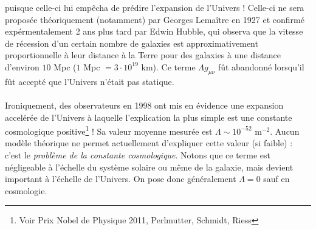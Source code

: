 puisque celle-ci lui empêcha de prédire l'expansion de l'Univers ! Celle-ci ne sera proposée théoriquement (notamment) par Georges Lemaître en 1927 et confirmé expérmentalement 2 ans plus tard par Edwin Hubble, qui observa que la vitesse de récession d'un certain nombre de galaxies est approximativement proportionnelle à leur distance à la Terre pour des galaxies à une distance d'environ $10$ Mpc ($1$ Mpc $ = 3 \cdot 10^{19}$ km). Ce terme $\Lambda g_{\mu\nu}$ fût abandonné lorsqu'il fût accepté que l'Univers n'était pas statique.\\
\\
Ironiquement, des observateurs en 1998 ont mis en évidence une expansion accelérée de l'Univers à laquelle l'explication la plus simple est une constante cosmologique positive\footnote{Voir Prix Nobel de Physique 2011, Perlmutter, Schmidt, Riess} ! Sa valeur moyenne mesurée est $\Lambda \sim 10^{-52}$ m$^{-2}$. Aucun modèle théorique ne permet actuellement d'expliquer cette valeur (si faible) : c'est le \emph{problème de la constante cosmologique}. Notons que ce terme est négligeable à l'échelle du système solaire ou même de la galaxie, mais devient important à l'échelle de l'Univers. On pose donc généralement $\Lambda = 0$ sauf en cosmologie.

